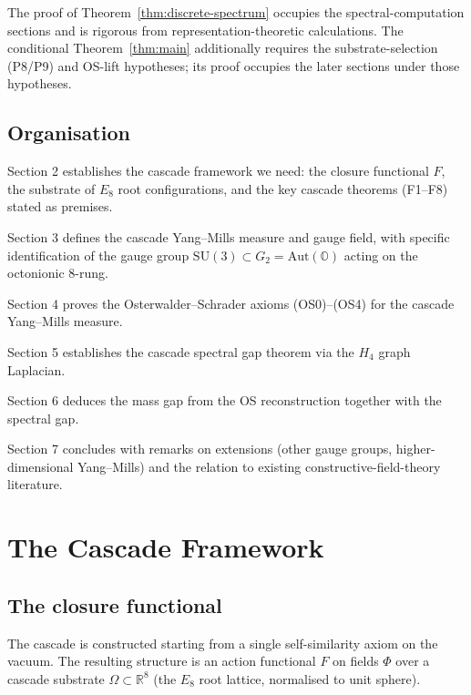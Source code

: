 \documentclass[11pt, a4paper]{amsart}
\theoremstyle{definition}
\newcommand{\R}{\mathbb{R}}
\begin{document}
The proof of Theorem~\ref{thm:discrete-spectrum} occupies the
spectral-computation sections and is rigorous from
representation-theoretic calculations. The conditional
Theorem~\ref{thm:main} additionally requires the substrate-selection
(P8/P9) and OS-lift hypotheses; its proof occupies the later
sections under those hypotheses.

\subsection{Organisation}

Section 2 establishes the cascade framework we need: the closure
functional $F$, the substrate of $E_8$ root configurations, and
the key cascade theorems (F1--F8) stated as premises.

Section 3 defines the cascade Yang--Mills measure and gauge field,
with specific identification of the gauge group $\mathrm{SU}(3) \subset G_2
= \mathrm{Aut}(\mathbb{O})$ acting on the octonionic 8-rung.

Section 4 proves the Osterwalder--Schrader axioms (OS0)--(OS4)
for the cascade Yang--Mills measure.

Section 5 establishes the cascade spectral gap theorem via the
$H_4$ graph Laplacian.

Section 6 deduces the mass gap from the OS reconstruction together
with the spectral gap.

Section 7 concludes with remarks on extensions (other gauge groups,
higher-dimensional Yang--Mills) and the relation to existing
constructive-field-theory literature.

\section{The Cascade Framework}

\subsection{The closure functional}

The cascade is constructed starting from a single self-similarity
axiom on the vacuum. The resulting structure is an action functional
$F$ on fields $\Phi$ over a cascade substrate $\Omega \subset \R^8$
(the $E_8$ root lattice, normalised to unit sphere).
\end{document}
